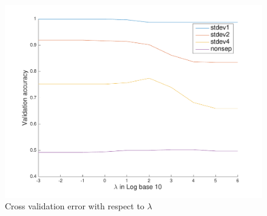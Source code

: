 \begin{figure}[h!]
\centering
	\includegraphics[scale=0.3]{hw2_1_cv.pdf}
	\caption{Cross validation error with respect to $\lambda$}\label{fig:LR_cv}
\end{figure}
	